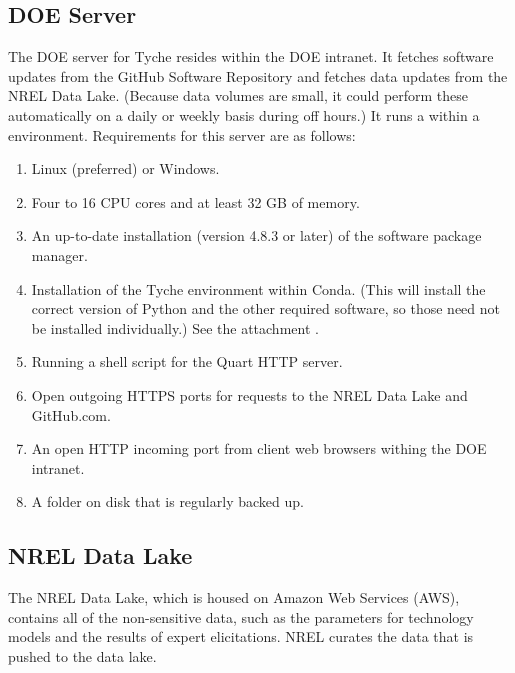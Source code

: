 \documentclass[letterpaper,10pt,english]{sphinxmanual}
\begin{document}
\subsection{DOE Server}
\label{\detokenize{doc-src/deployment:doe-server}}
The DOE server for Tyche resides within the DOE intranet. It fetches
software updates from the GitHub Software Repository and fetches data
updates from the NREL Data Lake. (Because data volumes are small, it
could perform these automatically on a daily or weekly basis during off
hours.) It runs a  within a
 environment.
Requirements for this server are as follows:
\begin{enumerate}
\def\theenumi{\arabic{enumi}}
\def\labelenumi{\theenumi .}
\makeatletter\def\p@enumii{\p@enumi \theenumi .}\makeatother
\item {} 
Linux (preferred) or Windows.

\item {} 
Four to 16 CPU cores and at least 32 GB of memory.

\item {} 
An up-to-date installation (version 4.8.3 or later) of the
 software
package manager.

\item {} 
Installation of the Tyche environment within Conda. (This will
install the correct version of Python and the other required
software, so those need not be installed individually.) See the
attachment .

\item {} 
Running a shell script for the Quart HTTP server.

\item {} 
Open outgoing HTTPS ports for  requests to the NREL Data Lake
and GitHub.com.

\item {} 
An open HTTP incoming port from client web browsers withing the DOE
intranet.

\item {} 
A folder on disk that is regularly backed up.

\end{enumerate}


\subsection{NREL Data Lake}
\label{\detokenize{doc-src/deployment:nrel-data-lake}}
The NREL Data Lake, which is housed on Amazon Web Services (AWS),
contains all of the non-sensitive data, such as the parameters for
technology models and the results of expert elicitations. NREL curates
the data that is pushed to the data lake.
\end{document}
